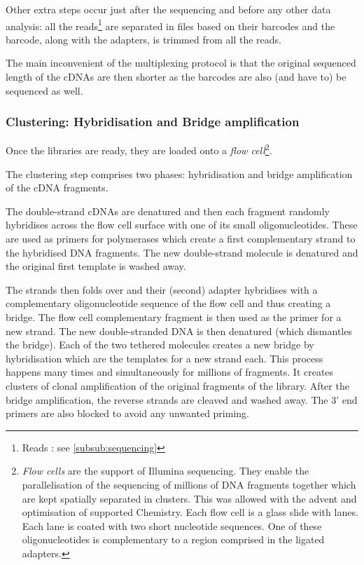 Other extra steps occur just after the sequencing and before any other data
analysis: all the reads\footnote{Reads : see \cref{subsub:sequencing}} are
separated in files based on their barcodes and the barcode, along with the
adapters, is trimmed from all the reads.

The main inconvenient of the multiplexing protocol is that the original sequenced
length of the \glspl{cDNA} are then shorter as the barcodes are also (and have
to) be sequenced as well.

\subsubsection[Clustering: Hybridisation and Bridge amplification]{Clustering:
Hybridisation and Bridge amplification }
\label{subsub:HybridClustAmp}

Once the libraries are ready, they are loaded onto a \emph{flow cell}\footnote{%
\emph{Flow cells} are the support of Illumina sequencing. They enable the
parallelisation of the sequencing of millions of \gls{DNA} fragments together
which are kept spatially separated in clusters. This was allowed with the advent
and optimisation of supported Chemistry. Each flow cell is a glass slide with
lanes. Each lane is coated with two short nucleotide sequences. One of these
oligonucleotides is complementary to a region comprised in the ligated adapters.}.

The clustering step comprises two phases: hybridisation and bridge amplification
of the \gls{cDNA} fragments.


The double-strand \glspl{cDNA} are denatured and then each fragment randomly
hybridises across the flow cell surface with one of its small oligonucleotides.
These are used as primers for polymerases which create a first complementary
strand to the hybridised \gls{DNA} fragments. The new double-strand molecule is
denatured and the original first template is washed away.

The strands then folds over and their (second) adapter hybridises with a
complementary oligonucleotide sequence of the flow cell and thus creating a
bridge. The flow cell complementary fragment is then used as the primer for a new
strand. The new double-stranded \gls{DNA} is then denatured (which
dismantles the bridge). Each of the two tethered molecules creates a new
bridge by hybridisation which are the templates for a new strand each.
This process happens many times and simultaneously for millions of fragments.
It creates clusters of clonal amplification of the original fragments of
the library. After the bridge amplification, the reverse strands are cleaved
and washed away. The 3' end primers are also blocked to avoid any unwanted
priming.

